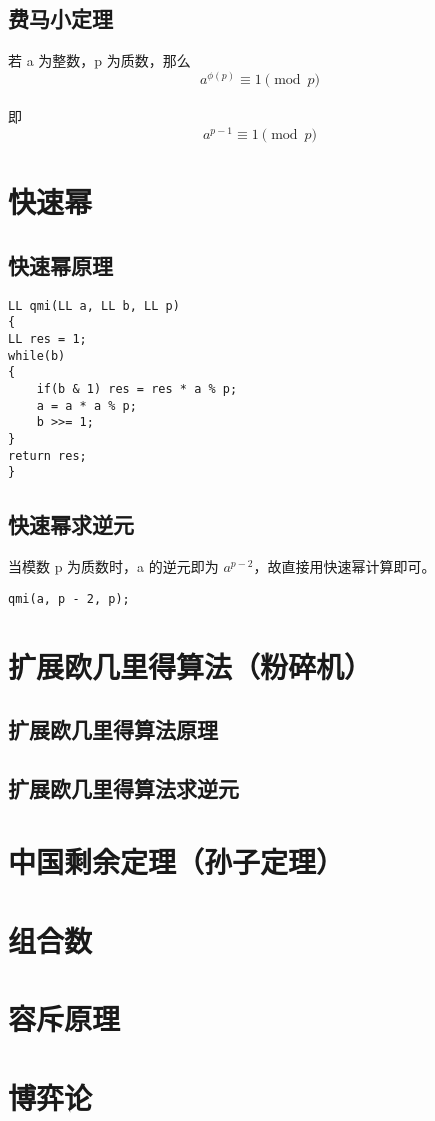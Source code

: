 \documentclass[]{book}
\begin{document}
\section{费马小定理}
若 a 为整数，p 为质数，那么
\[a^{\phi(p)}\equiv 1 \pmod{p}\]\\即
\[a^{p-1}\equiv 1 \pmod{p}\]
\chapter{快速幂}
\section{快速幂原理}
\begin{lstlisting}
LL qmi(LL a, LL b, LL p)
{
LL res = 1;
while(b)
{
    if(b & 1) res = res * a % p;
    a = a * a % p;
    b >>= 1;
}
return res;
}
\end{lstlisting}
\section{快速幂求逆元}
当模数 p 为质数时，a 的逆元即为 $a^{p-2}$，故直接用快速幂计算即可。
\begin{lstlisting}
qmi(a, p - 2, p);
\end{lstlisting}
\chapter{扩展欧几里得算法（粉碎机）}
\section{扩展欧几里得算法原理}
\section{扩展欧几里得算法求逆元}

\chapter{中国剩余定理（孙子定理）}

\chapter{组合数}

\chapter{容斥原理}

\chapter{博弈论}
\end{document}
